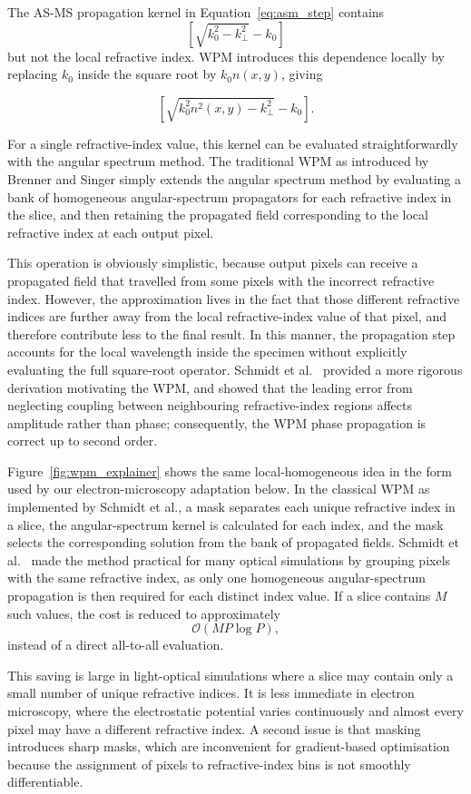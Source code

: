 \documentclass[preprint,12pt,number]{elsarticle}
\begin{document}
The AS-MS propagation kernel in Equation~\eqref{eq:asm_step} contains
\[
\left[\sqrt{k_0^2-k_\perp^2}-k_0\right]
\]
but not the local refractive index. WPM introduces this dependence locally by
replacing $k_0$ inside the square root by $k_0n(x,y)$, giving

\[
\left[\sqrt{k_0^2n^2(x,y)-k_\perp^2}-k_0\right].
\]

For a single refractive-index value, this kernel can be evaluated
straightforwardly with the angular spectrum method. The traditional WPM as introduced
by Brenner and Singer simply extends the
angular spectrum method by evaluating a bank of homogeneous angular-spectrum
propagators for each refractive index in the slice, and then retaining the
propagated field corresponding to the local refractive index at each output
pixel. 

This operation is obviously simplistic, because output pixels can receive a
propagated field that travelled from some pixels with the incorrect refractive
index. However, the approximation lives in the fact that those different
refractive indices are further away from the local refractive-index value of
that pixel, and therefore contribute less to the final result. In this manner,
the propagation step accounts for the local wavelength inside the specimen
without explicitly evaluating the full square-root operator. Schmidt
et al.~\cite{Schmidt2016} provided a more rigorous 
derivation motivating the WPM, and showed that the leading error from neglecting coupling
between neighbouring refractive-index regions affects amplitude rather than
phase; consequently, the WPM phase propagation is correct up to second order.

Figure~\ref{fig:wpm_explainer} shows the same local-homogeneous idea in the
form used by our electron-microscopy adaptation below. In the classical WPM as
implemented by Schmidt et al., a mask separates each unique refractive index in
a slice, the angular-spectrum kernel is calculated for each index, and the mask
selects the corresponding solution from the bank of propagated fields.
Schmidt et al.~\cite{Schmidt2016} made the method practical
for many optical simulations by grouping pixels with the same refractive
index, as only one homogeneous angular-spectrum propagation is then required for
each distinct index value. If a slice contains $M$ such values, the cost is
reduced to approximately
\[
\mathcal O(MP\log P),
\]
instead of a direct all-to-all evaluation.

This saving is large in light-optical simulations where a slice may contain only
a small number of unique refractive indices. It is less immediate in electron
microscopy, where the electrostatic potential varies continuously and almost
every pixel may have a different refractive index. A second issue is that masking introduces sharp masks, which
are inconvenient for gradient-based optimisation because the assignment of pixels
to refractive-index bins is not smoothly differentiable.
\end{document}

